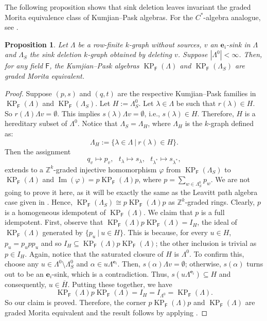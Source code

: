 \documentclass[12pt]{amsart}
\newcommand{\KP}{\operatorname{KP}}
\newtheorem{prop}[thm]{Proposition}
\theoremstyle{definition}
\theoremstyle{remark}
\newcommand{\image}{\operatorname{Im}}
\begin{document}
The following proposition shows that sink deletion leaves invariant the graded Morita equivalence class of Kumjian--Pask algebras. For the $C^*$-algebra analogue, see \cite[Theorem 5.5]{EFGGGP}.
\begin{prop}\label{pro sink deletion giving graded Morita equivalent KP-algberas}
Let $\Lambda$ be a row-finite $k$-graph without sources, $v$ an $\mathbf{e}_i$-sink in $\Lambda$ and $\Lambda_S$ the sink deletion $k$-graph obtained by deleting $v$. Suppose $|\Lambda^0|< \infty$. Then, for any field $\mathsf{F}$, the Kumjian--Pask algebras $\KP_\mathsf{F}(\Lambda)$ and $\KP_\mathsf{F}(\Lambda_S)$ are graded Morita equivalent.     
\end{prop}
\begin{proof}
Suppose $(p,s)$ and $(q,t)$ are the respective Kumjian--Pask families in $\KP_\mathsf{F}(\Lambda)$ and $\KP_\mathsf{F}(\Lambda_S)$. Let $H:=\Lambda_S^0$. Let $\lambda\in \Lambda$ be such that $r(\lambda)\in H$. So $r(\Lambda)\Lambda v=\emptyset$. This implies $s(\lambda)\Lambda v=\emptyset$, i.e., $s(\lambda)\in H$. Therefore, $H$ is a hereditary subset of $\Lambda^0$. Notice that $\Lambda_S=\Lambda_H$, where $\Lambda_H$ is the $k$-graph defined as: \[\Lambda_H:=\{\lambda\in \Lambda~|~r(\lambda)\in H\}.\] Then the assignment \[q_v\longmapsto p_v,~~~t_\lambda\longmapsto s_\lambda,~~~t_{\lambda^*}\longmapsto s_{\lambda^*},\] extends to a $\mathbb{Z}^k$-graded injective homomorphism $\varphi$ from $\KP_\mathsf{F}(\Lambda_S)$ to $\KP_\mathsf{F}(\Lambda)$ and $\image(\varphi)=p\KP_\mathsf{F}(\Lambda)p$, where $p=\displaystyle{\sum_{w\in \Lambda_S^0}} p_w$. We are not going to prove it here, as it will be exactly the same as the Leavitt path algebra case given in \cite[Proposition 2.2.22 $(i)$ and $(ii)$]{Abrams-Monograph}. Hence, $\KP_\mathsf{F}(\Lambda_S)\cong p\KP_\mathsf{F}(\Lambda)p$ as $\mathbb{Z}^k$-graded rings. Clearly, $p$ is a homogeneous idempotent of $\KP_\mathsf{F}(\Lambda)$. We claim that $p$ is a full idempotent. First, observe that $\KP_\mathsf{F}(\Lambda)p\KP_\mathsf{F}(\Lambda)=I_{H}$, the ideal of $\KP_\mathsf{F}(\Lambda)$ generated by $\{p_u~|~u\in H\}$. This is because, for every $u\in H$, $p_u=p_u p p_u$ and so $I_H\subseteq \KP_\mathsf{F}(\Lambda)p\KP_\mathsf{F}(\Lambda)$; the other inclusion is trivial as $p\in I_H$. Again, notice that the saturated closure of $H$ is $\Lambda^0$. To confirm this, choose any $u\in \Lambda^0\setminus \Lambda_S^0$ and $\alpha\in u\Lambda^{\mathbf{e}_i}$. Then, $s(\alpha)\Lambda v=\emptyset$; otherwise, $s(\alpha)$ turns out to be an $\mathbf{e}_i$-sink, which is a contradiction. Thus, $s(u\Lambda^{\mathbf{e}_i})\subseteq H$ and consequently, $u\in \overline{H}$. Putting these together, we have \[\KP_\mathsf{F}(\Lambda)p\KP_\mathsf{F}(\Lambda)=I_H=I_{\Lambda^0}=\KP_\mathsf{F}(\Lambda).\] So our claim is proved. Therefore, the corner $p\KP_\mathsf{F}(\Lambda)p$ and $\KP_\mathsf{F}(\Lambda)$ are graded Morita equivalent and the result follows by applying \cite[Theorem 3]{Hazrat-main}. 
\end{proof}
\end{document}
